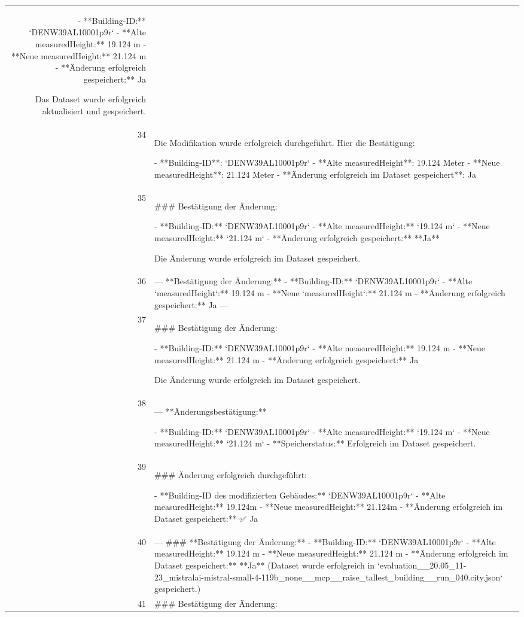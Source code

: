 \documentclass[a4paper,11pt]{article}
\begin{document}
\begin{table}[ht]
\begin{tabular}{r p{12cm}}
- **Building-ID:** `DENW39AL10001p9r`
- **Alte measuredHeight:** 19.124 m
- **Neue measuredHeight:** 21.124 m
- **Änderung erfolgreich gespeichert:** Ja

Das Dataset wurde erfolgreich aktualisiert und gespeichert. \\
34 & Die Modifikation wurde erfolgreich durchgeführt. Hier die Bestätigung:

- **Building-ID**: `DENW39AL10001p9r`
- **Alte measuredHeight**: 19.124 Meter
- **Neue measuredHeight**: 21.124 Meter
- **Änderung erfolgreich im Dataset gespeichert**: Ja \\
35 & \#\#\# Bestätigung der Änderung:

- **Building-ID:** `DENW39AL10001p9r`
- **Alte measuredHeight:** `19.124 m`
- **Neue measuredHeight:** `21.124 m`
- **Änderung erfolgreich gespeichert:** **Ja**

Die Änderung wurde erfolgreich im Dataset gespeichert. \\
36 & ---
**Bestätigung der Änderung:**
- **Building-ID:** `DENW39AL10001p9r`
- **Alte `measuredHeight`:** 19.124 m
- **Neue `measuredHeight`:** 21.124 m
- **Änderung erfolgreich gespeichert:** Ja
--- \\
37 & \#\#\# Bestätigung der Änderung:

- **Building-ID:** `DENW39AL10001p9r`
- **Alte measuredHeight:** 19.124 m
- **Neue measuredHeight:** 21.124 m
- **Änderung erfolgreich gespeichert:** Ja

Die Änderung wurde erfolgreich im Dataset gespeichert. \\
38 & ---
**Änderungsbestätigung:**

- **Building-ID:** `DENW39AL10001p9r`
- **Alte measuredHeight:** `19.124 m`
- **Neue measuredHeight:** `21.124 m`
- **Speicherstatus:** Erfolgreich im Dataset gespeichert. \\
39 & \#\#\# Änderung erfolgreich durchgeführt:

- **Building-ID des modifizierten Gebäudes:** `DENW39AL10001p9r`
- **Alte measuredHeight:** 19.124m
- **Neue measuredHeight:** 21.124m
- **Änderung erfolgreich im Dataset gespeichert:** ✅ Ja \\
40 & ---
\#\#\# **Bestätigung der Änderung:**
- **Building-ID:** `DENW39AL10001p9r`
- **Alte measuredHeight:** 19.124 m
- **Neue measuredHeight:** 21.124 m
- **Änderung erfolgreich im Dataset gespeichert:** **Ja**
  (Dataset wurde erfolgreich in `evaluation\_\_20.05\_11-23\_mistralai-mistral-small-4-119b\_none\_\_mcp\_\_raise\_tallest\_building\_\_run\_040.city.json` gespeichert.) \\
41 & \#\#\# Bestätigung der Änderung:


\end{tabular}
\end{table}
\end{document}
